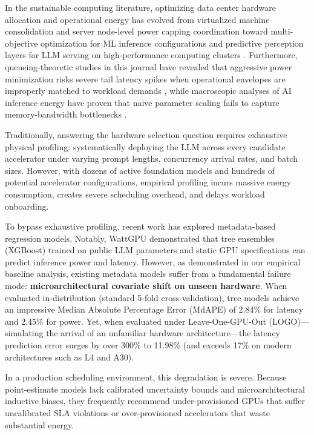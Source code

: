 \documentclass[preprint,12pt]{elsarticle}
\begin{document}
In the sustainable computing literature, optimizing data center hardware allocation and operational energy has evolved from virtualized machine consolidation \citep{suscom_malekloo2018, suscom_kumar2022} and server node-level power capping coordination \citep{suscom_powercoord2020} toward multi-objective optimization for ML inference configurations \citep{suscom_multiobj2026} and predictive perception layers for LLM serving on high-performance computing clusters \citep{suscom_forecasting2026}. Furthermore, queueing-theoretic studies in this journal have revealed that aggressive power minimization risks severe tail latency spikes when operational envelopes are improperly matched to workload demands \citep{suscom_tradeoffs2025}, while macroscopic analyses of AI inference energy have proven that naive parameter scaling fails to capture memory-bandwidth bottlenecks \citep{suscom_desislavov2023}.

Traditionally, answering the hardware selection question requires exhaustive physical profiling: systematically deploying the LLM across every candidate accelerator under varying prompt lengths, concurrency arrival rates, and batch sizes. However, with dozens of active foundation models and hundreds of potential accelerator configurations, empirical profiling incurs massive energy consumption, creates severe scheduling overhead, and delays workload onboarding.

To bypass exhaustive profiling, recent work has explored metadata-based regression models. Notably, WattGPU \citep{fadel2026wattgpu} demonstrated that tree ensembles (XGBoost) trained on public LLM parameters and static GPU specifications can predict inference power and latency. However, as demonstrated in our empirical baseline analysis, existing metadata models suffer from a fundamental failure mode: \textbf{microarchitectural covariate shift on unseen hardware}. When evaluated in-distribution (standard 5-fold cross-validation), tree models achieve an impressive Median Absolute Percentage Error (MdAPE) of 2.84\% for latency and 2.45\% for power. Yet, when evaluated under Leave-One-GPU-Out (LOGO)---simulating the arrival of an unfamiliar hardware architecture---the latency prediction error surges by over 300\% to 11.98\% (and exceeds 17\% on modern architectures such as L4 and A30).

In a production scheduling environment, this degradation is severe. Because point-estimate models lack calibrated uncertainty bounds and microarchitectural inductive biases, they frequently recommend under-provisioned GPUs that suffer uncalibrated SLA violations or over-provisioned accelerators that waste substantial energy.
\end{document}
